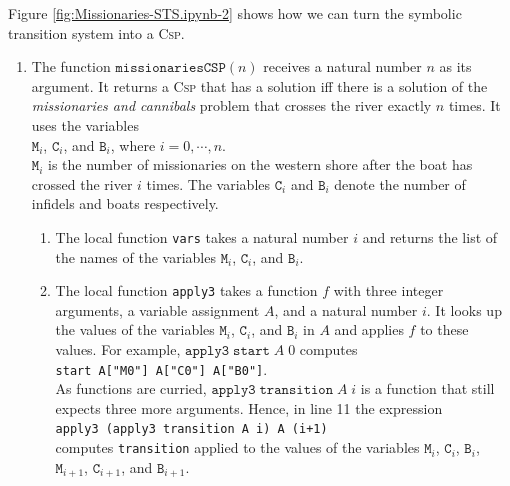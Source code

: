 Figure \ref{fig:Missionaries-STS.ipynb-2} shows how we can turn the symbolic transition system into a
\textsc{Csp}.
\begin{enumerate}
\item The function $\mathtt{missionariesCSP}(n)$ receives a natural number $n$ as its argument.
       It returns a \textsc{Csp} that has a solution iff there is a solution of the \emph{missionaries and cannibals}
       problem that crosses the river exactly $n$ times.  It uses the variables
       \\[0.2cm]
       \hspace*{1.3cm}
       $\mathtt{M}_i$, $\mathtt{C}_i$, and $\mathtt{B}_i$, where $i=0,\cdots,n$.
       \\[0.2cm]
       $\mathtt{M}_i$ is the number of missionaries on the western shore after the boat has crossed the river
       $i$ times. The variables $\mathtt{C}_i$ and $\texttt{B}_i$ denote the number of infidels and boats
       respectively.
       \begin{enumerate}
       \item The local function \texttt{vars} takes a natural number $i$ and returns the list of the names of the
             variables $\mathtt{M}_i$, $\mathtt{C}_i$, and $\mathtt{B}_i$.
       \item The local function \texttt{apply3} takes a function $f$ with three integer arguments, a variable
             assignment $A$, and a natural number $i$.  It looks up the values of the variables
             $\mathtt{M}_i$, $\mathtt{C}_i$, and $\mathtt{B}_i$ in $A$ and applies $f$ to these values.
             For example, $\mathtt{apply3}\;\mathtt{start}\;A\;0$ computes
             \\[0.2cm]
             \hspace*{1.3cm}
             \texttt{start A["M0"] A["C0"] A["B0"]}.
             \\[0.2cm]
             As \Fsharp{} functions are curried, $\mathtt{apply3}\;\mathtt{transition}\;A\;i$ is a function that
             still expects three more arguments.  Hence, in line 11 the expression
             \\[0.2cm]
             \hspace*{1.3cm}
             \texttt{apply3 (apply3 transition A i) A (i+1)}
             \\[0.2cm]
             computes \texttt{transition} applied to the values of the variables $\mathtt{M}_i$, $\mathtt{C}_i$,
             $\mathtt{B}_i$, $\mathtt{M}_{i+1}$, $\mathtt{C}_{i+1}$, and $\mathtt{B}_{i+1}$.

\end{enumerate}
\end{enumerate}
